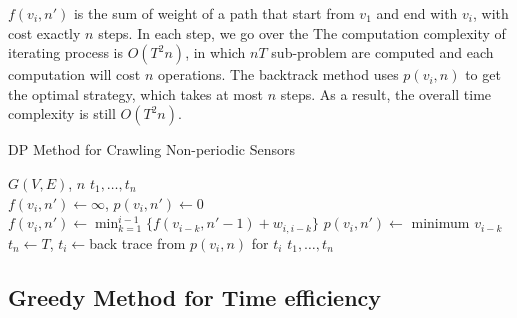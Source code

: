 \documentclass[conference]{IEEEtran}
\begin{document}
$f(v_i,n')$ is the sum of weight of a path that start from $v_1$ and end with $v_i$, with cost exactly $n$ steps. In each step, we go over the  The computation complexity of iterating process is $O(T^2n)$, in which $nT$ sub-problem are computed and each computation will cost $n$ operations. The backtrack method uses $p(v_i, n)$ to get the optimal strategy, which takes at most $n$ steps. As a result, the overall time complexity is still $O(T^2n)$.
\begin{algorithm}
	\caption{DP Method for Crawling Non-periodic Sensors}
	\label{alg:dp_min}
	\begin{algorithmic}[1]
		\renewcommand{\algorithmicrequire}{\textbf{Input:}}
		\renewcommand{\algorithmicensure}{\textbf{Output:}}
		\REQUIRE $G(V,E)$, $n$
		\ENSURE  $t_1,\ldots,t_n$
		\\
		\STATE $f(v_i,n') \gets \infty$, $p(v_i,n')\gets 0$
		\STATE $f(v_i,n')\gets\min_{k=1}^{i-1}\{f(v_{i-k}, n'-1)+w_{i,i-k}\}$
		\STATE $p(v_i,n')\gets$ minimum $v_{i-k}$
		\ENDFOR
		\ENDFOR
		\STATE $t_n\gets T$, $t_i\gets$back trace from $p(v_i, n)$ for $t_i$
		\RETURN $t_1,\ldots,t_n$
	\end{algorithmic}
\end{algorithm}

\subsection{Greedy Method for Time efficiency}
\end{document}
